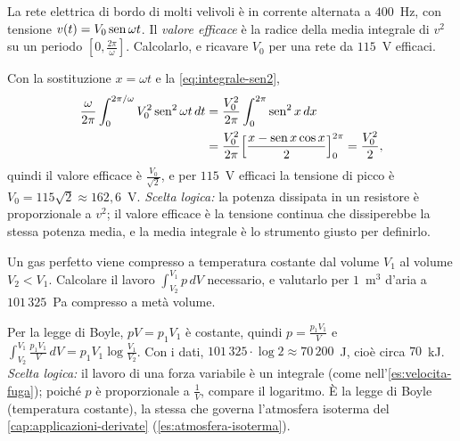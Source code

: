 \begin{esercizio}
La rete elettrica di bordo di molti velivoli è in corrente alternata a $400$~Hz, con
tensione $v(t)=V_{0}\operatorname{sen}\omega t$. Il \emph{valore efficace} è la radice della media integrale
di $v^{2}$ su un periodo $[0,\frac{2\pi}\omega]$. Calcolarlo, e ricavare $V_{0}$ per una rete da $115$~V
efficaci.
\begin{soluzione}
Con la sostituzione $x=\omega t$ e la \eqref{eq:integrale-sen2},
\[
\begin{aligned}
  \frac\omega{2\pi}\int_{0}^{2\pi/\omega}V_{0}^{2}\operatorname{sen}^{2}\omega t\,dt
  &=\frac{V_{0}^{2}}{2\pi}\int_{0}^{2\pi}\operatorname{sen}^{2}x\,dx\\
  &=\frac{V_{0}^{2}}{2\pi}\Bigl[\frac{x-\operatorname{sen} x\cos x}2\Bigr]_{0}^{2\pi}=\frac{V_{0}^{2}}2 ,
\end{aligned}
\]
quindi il valore efficace è $\frac{V_{0}}{\sqrt2}$, e per $115$~V efficaci la tensione di picco è
$V_{0}=115\sqrt2\approx162{,}6$~V. \emph{Scelta logica:} la potenza dissipata in un resistore è
proporzionale a $v^{2}$; il valore efficace è la tensione continua che dissiperebbe la
stessa potenza media, e la media integrale è lo strumento giusto per definirlo.
\end{soluzione}
\end{esercizio}

\begin{esercizio}
Un gas perfetto viene compresso a temperatura costante dal volume $V_{1}$ al volume $V_{2}<V_{1}$.
Calcolare il lavoro $\int_{V_{2}}^{V_{1}}p\,dV$ necessario, e valutarlo per $1$~m$^{3}$ d'aria a
$101\,325$~Pa compresso a metà volume.
\begin{soluzione}
Per la legge di Boyle, $pV=p_{1}V_{1}$ è costante, quindi $p=\frac{p_{1}V_{1}}V$ e
$\int_{V_{2}}^{V_{1}}\frac{p_{1}V_{1}}V\,dV=p_{1}V_{1}\log\frac{V_{1}}{V_{2}}$. Con i dati,
$101\,325\cdot\log2\approx70\,200$~J, cioè circa $70$~kJ. \emph{Scelta logica:} il lavoro di una forza
variabile è un integrale (come nell'\cref{es:velocita-fuga}); poiché $p$ è proporzionale a
$\frac1V$, compare il logaritmo. È la legge di Boyle (temperatura costante),
la stessa che governa l'atmosfera isoterma del \cref{cap:applicazioni-derivate}
(\cref{es:atmosfera-isoterma}).
\end{soluzione}
\end{esercizio}

